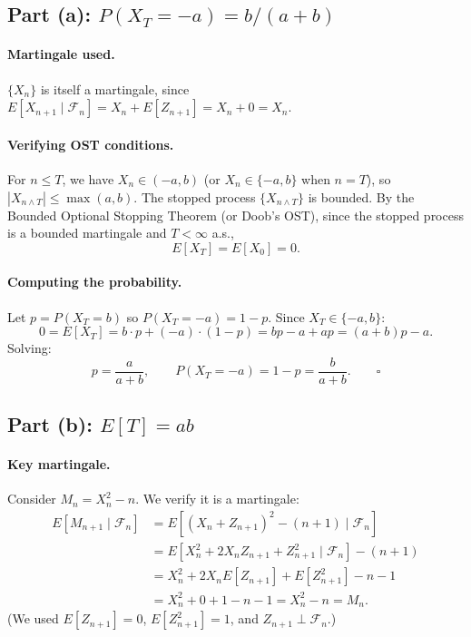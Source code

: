 \documentclass[11pt]{article}
\newcommand{\1}{\mathbf{1}}
\theoremstyle{plain}
\begin{document}
\subsection*{Part (a): $P(X_T=-a)=b/(a+b)$}

\paragraph{Martingale used.}
$\{X_n\}$ is itself a martingale, since $E[X_{n+1}\mid\mathcal{F}_n]
=X_n+E[Z_{n+1}]=X_n+0=X_n$.

\paragraph{Verifying OST conditions.}
For $n\le T$, we have $X_n\in(-a,b)$ (or $X_n\in\{-a,b\}$ when $n=T$), so
$|X_{n\wedge T}|\le\max(a,b)$. The stopped process $\{X_{n\wedge T}\}$ is bounded.
By the Bounded Optional Stopping Theorem (or Doob's OST), since the stopped process
is a bounded martingale and $T<\infty$ a.s.,
\[
  E[X_T] = E[X_0] = 0.
\]

\paragraph{Computing the probability.}
Let $p=P(X_T=b)$ so $P(X_T=-a)=1-p$. Since $X_T\in\{-a,b\}$:
\[
  0 = E[X_T] = b\cdot p + (-a)\cdot(1-p) = bp - a + ap = (a+b)p - a.
\]
Solving:
\[
  p = \frac{a}{a+b},
  \qquad
  P(X_T=-a) = 1-p = \frac{b}{a+b}.
  \qquad\square
\]

\subsection*{Part (b): $E[T]=ab$}

\paragraph{Key martingale.}
Consider $M_n=X_n^2-n$. We verify it is a martingale:
\begin{align*}
  E[M_{n+1}\mid\mathcal{F}_n]
  &= E[(X_n+Z_{n+1})^2-(n+1)\mid\mathcal{F}_n] \\
  &= E[X_n^2+2X_nZ_{n+1}+Z_{n+1}^2\mid\mathcal{F}_n] - (n+1) \\
  &= X_n^2 + 2X_n E[Z_{n+1}] + E[Z_{n+1}^2] - n - 1 \\
  &= X_n^2 + 0 + 1 - n - 1 = X_n^2-n = M_n.
\end{align*}
(We used $E[Z_{n+1}]=0$, $E[Z_{n+1}^2]=1$, and $Z_{n+1}\perp\mathcal{F}_n$.)
\end{document}
